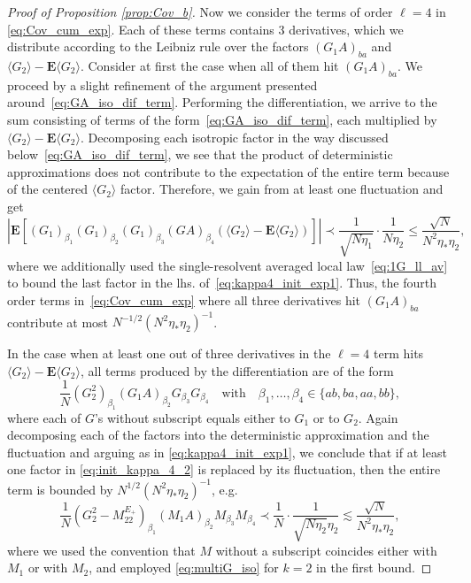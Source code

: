 \documentclass[10pt]{amsart}
\numberwithin{equation}{section}
\newcommand{\E}{\mathbf{E}}
\begin{document}
\begin{proof}[Proof of Proposition \ref{prop:Cov_b}]
Now we consider the terms of order $\ell=4$ in \eqref{eq:Cov_cum_exp}. Each of these terms contains 3 derivatives, which we distribute according to the Leibniz rule over the factors $\left(G_1A\right)_{ba}$ and $\langle G_2\rangle -\E\langle G_2\rangle$. Consider at first the case when all of them hit $\left(G_1A\right)_{ba}$. We proceed by a slight refinement of the argument presented around~\eqref{eq:GA_iso_dif_term}. Performing the differentiation, we arrive to the sum consisting of terms of the form~\eqref{eq:GA_iso_dif_term}, each multiplied by $\langle G_2\rangle -\E\langle G_2\rangle$. Decomposing each isotropic factor in the way discussed below~\eqref{eq:GA_iso_dif_term}, we see that the product of deterministic approximations does not contribute to the expectation of the entire term because of the centered $\langle G_2\rangle$ factor. Therefore, we gain from at least one fluctuation and get
\begin{equation}
\left\vert \E\left[(G_1)_{\beta_1}(G_1)_{\beta_2}(G_1)_{\beta_3}(GA)_{\beta_{4}}(\langle G_2\rangle -\E\langle G_2\rangle)\right]\right\vert \prec \frac{1}{\sqrt{N\eta_1}}\cdot\frac{1}{N\eta_2}\le \frac{\sqrt{N}}{N^2\eta_*\eta_2}, 
\label{eq:kappa4_init_exp1}
\end{equation}
where we additionally used the single-resolvent averaged local law~\eqref{eq:1G_ll_av} to bound the last factor in the lhs. of~\eqref{eq:kappa4_init_exp1}. Thus, the fourth order terms in~\eqref{eq:Cov_cum_exp} where all three derivatives hit $(G_1A)_{ba}$ contribute at most $N^{-1/2}(N^2\eta_*\eta_2)^{-1}$.

In the case when at least one out of three derivatives in the $\ell=4$ term hits $\langle G_2\rangle-\E\langle G_2\rangle$, all terms produced by the differentiation are of the form
\begin{equation}
\frac{1}{N}(G_2^2)_{\beta_1}(G_1A)_{\beta_2}G_{\beta_3}G_{\beta_4}\quad\text{with}\quad \beta_1,\ldots,\beta_{4}\in\{ab,ba,aa,bb\},
\label{eq:init_kappa_4_2}
\end{equation}
where each of $G$'s without subscript equals either to $G_1$ or to $G_2$. Again decomposing each of the factors into the deterministic approximation and the fluctuation and arguing as in \eqref{eq:kappa4_init_exp1}, we conclude that if at least one factor in \eqref{eq:init_kappa_4_2} is replaced by its fluctuation, then the entire term is bounded by $N^{1/2}(N^2\eta_*\eta_2)^{-1}$, e.g.   
\begin{equation}
\frac{1}{N}\left(G_2^2-M_{22}^{E_+}\right)_{\beta_1}(M_1A)_{\beta_2}M_{\beta_3}M_{\beta_4}\prec \frac{1}{N}\cdot \frac{1}{\sqrt{N\eta_2}\eta_2}\lesssim \frac{\sqrt{N}}{N^2\eta_*\eta_2},
\label{eq:kappa4_init_exp2}
\end{equation}
where we used the convention that $M$ without a subscript coincides either with $M_1$ or with $M_2$, and employed \eqref{eq:multiG_iso} for $k=2$ in the first bound. 


\end{proof}
\end{document}
